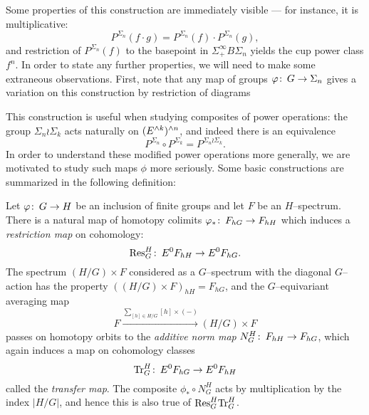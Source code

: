 Some properties of this construction are immediately visible --- for instance, it is multiplicative: \[P^{\Sigma_n}(f \cdot g) = P^{\Sigma_n}(f) \cdot P^{\Sigma_n}(g),\] and restriction of $P^{\Sigma_n}(f)$ to the basepoint in $\Sigma^\infty_+ B\Sigma_n$ yields the cup power class $f^n$.  In order to state any further properties, we will need to make some extraneous observations.  First, note that any map of groups $\varphi\colon\thinspace G \to \Sigma_n$ gives a variation on this construction by restriction of diagrams
\begin{center}
\end{center}
This construction is useful when studying composites of power operations: the group $\Sigma_n \wr \Sigma_k$ acts naturally on $(E^{\wedge k})^{\wedge n}$, and indeed there is an equivalence \[P^{\Sigma_n} \circ P^{\Sigma_k} = P^{\Sigma_n \wr \Sigma_k}.\]  In order to understand these modified power operations more generally, we are motivated to study such maps $\phi$ more seriously.  Some basic constructions are summarized in the following definition:
\begin{definition}
Let $\varphi\colon\thinspace G \to H$ be an inclusion of finite groups and let $F$ be an $H$--spectrum.  There is a natural map of homotopy colimits $\varphi_*\colon\thinspace F_{hG} \to F_{hH}$ which induces a \textit{restriction map} on cohomology: \[\mathrm{Res}_G^H\colon\thinspace E^0 F_{hH} \to E^0 F_{hG}.\]  The spectrum $(H/G) \times F$ considered as a $G$--spectrum with the diagonal $G$--action has the property $((H/G) \times F)_{hH} = F_{hG}$, and the $G$--equivariant averaging map \[F \xrightarrow{\displaystyle \sum_{[h] \in H/G} [h] \times (-)} (H/G) \times F\] passes on homotopy orbits to the \textit{additive norm map} $N_G^H\colon\thinspace F_{hH} \to F_{hG}$, which again induces a map on cohomology classes \[\mathrm{Tr}_G^H\colon\thinspace E^0 F_{hG} \to E^0 F_{hH}\] called the \textit{transfer map}.  The composite $\phi_* \circ N_G^H$ acts by multiplication by the index $|H/G|$, and hence this is also true of $\mathrm{Res}^H_G \mathrm{Tr}^H_G$.
\end{definition}

